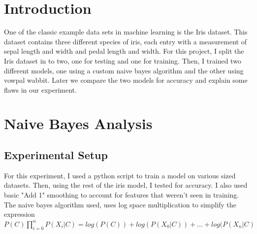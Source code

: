 \documentclass{article}
\begin{document}
 


\section{Introduction} 

One of the classic example data sets in machine learning is the Iris dataset. This dataset contains three different species of iris, each entry with a measurement of sepal length and width and pedal length and width. For this project, I split the Iris dataset in to two, one for testing and one for training. Then, I trained two different models, one using a custom naive bayes algorithm and the other using vowpal wabbit. Later we compare the two models for accuracy and explain some flaws in our experiment. 
  

\section{Naive Bayes Analysis}

\subsection{Experimental Setup}

For this experiment, I used a python script to train a model on various sized datasets. Then, using the rest of the iris model, I tested for accuracy. I also used basic "Add 1" smoothing to account for features that weren't seen in training.  The naive bayes algorithm used, uses log space multiplication to simplify the expression\\

$P(C) \prod_{i=0}^n P(X_i | C) = log(P(C)) + log(P(X_0|C)) + ... + log(P(X_n|C)$
\end{document}
